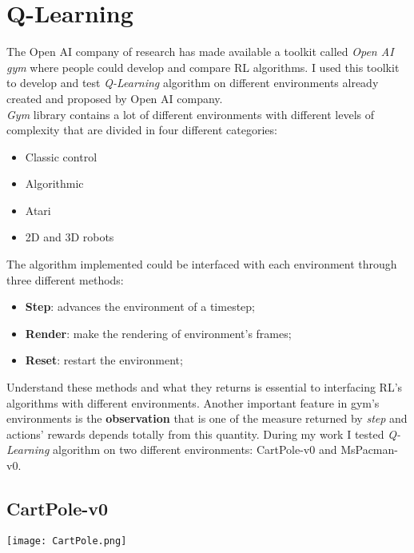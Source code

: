 \documentclass[]{report}
\begin{document}
\section{Q-Learning}
The Open AI company of research has made available a toolkit called \emph{Open AI gym} where people could 
develop and compare RL algorithms.
I used this toolkit to develop and test \emph{Q-Learning} algorithm on different environments already created and proposed by Open AI company. \\
\emph{Gym} library contains a lot of different environments with different levels of complexity that are divided in four different categories:
\begin{itemize}
	\item Classic control
	\item Algorithmic
	\item Atari
	\item 2D and 3D robots
\end{itemize}

The algorithm implemented could be interfaced with each environment through three different methods:
\begin{itemize}
	\item \textbf{Step}: advances the environment of a timestep;
	\item \textbf{Render}: make the rendering of environment's frames;
	\item \textbf{Reset}: restart the environment;
\end{itemize}

Understand these methods and what they returns is essential to interfacing RL's algorithms with different environments.
Another important feature in gym's environments is the \textbf{observation} that is one of the measure returned by \emph{step} and actions' rewards depends totally from this quantity.
During my work I tested \emph{Q-Learning} algorithm on two different environments: CartPole-v0 and MsPacman-v0.

\subsection{CartPole-v0}
\vspace{1ex}
\begin{center}
	\texttt{[image: CartPole.png]}
\end{center}
\vspace{2ex}
\end{document}
